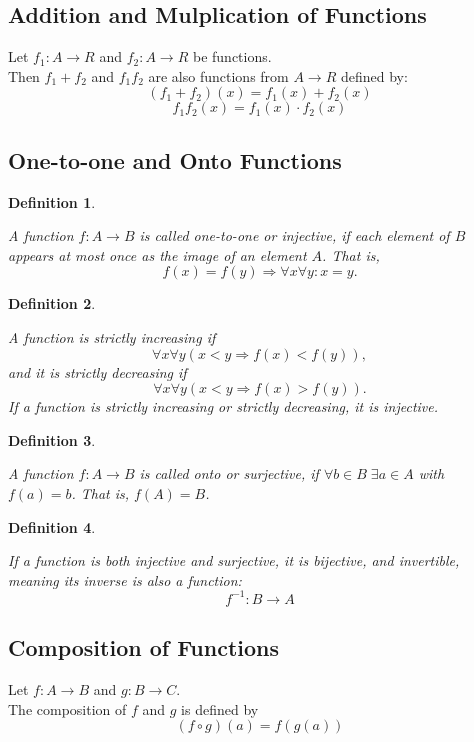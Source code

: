 \documentclass[12pt]{article}
\newtheorem{definition}{Definition} [section]
\begin{document}
\subsection{Addition and Mulplication of Functions}
Let $f_1: A \rightarrow R$ and $f_2: A \rightarrow R$ be functions.\\
Then $f_1+f_2$ and $f_1f_2$ are also functions from $A \rightarrow R$ defined by:
\[(f_1 + f_2) (x) = f_1(x) + f_2 (x)\]
\[f_1f_2 (x) = f_1(x) \cdot f_2(x)\]
\subsection{One-to-one and Onto Functions}
\begin{definition}
\begin{em}
A function $f: A \rightarrow B$ is called \emph{one-to-one} or \emph{injective}, if each element of $B$ appears at most once as the image of an element $A$. That is,
\[f(x)=f(y) \Rightarrow \forall x \forall y: x = y.\]
\end{em}
\end{definition}
\begin{definition}
\begin{em}
A function is \emph{strictly increasing} if
\[\forall x \forall y ( x < y \Rightarrow f(x) < f(y)),\]
and it is \emph{strictly decreasing} if
\[\forall x \forall y ( x < y \Rightarrow f(x) > f(y)).\]
If a function is strictly increasing or strictly decreasing, it is injective.
\end{em}
\end{definition}
\begin{definition}
\begin{em}
A function $f: A \rightarrow B$ is called \emph{onto} or \emph{surjective}, if $\forall b \in B \; \exists a \in A$ with $f(a) = b$. That is, $f(A) = B$.
\end{em}
\end{definition}
\begin{definition}
\begin{em}
If a function is both injective and surjective, it is \emph{bijective}, and \emph{invertible}, meaning its inverse is also a function: \[f^{-1}: B \rightarrow A\]
\end{em}
\end{definition}
\subsection{Composition of Functions}
Let $f: A \rightarrow B$ and $g: B \rightarrow C$.\\
The composition of $f$ and $g$ is defined by \[(f \circ g) (a) = f(g(a))\]
\end{document}
